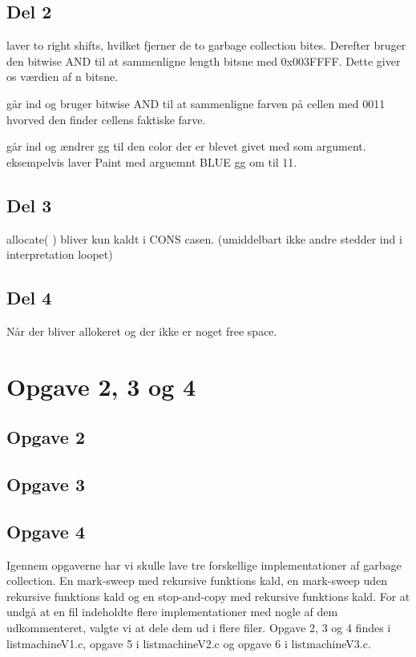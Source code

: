\subsection{Del 2}
\label{O1_2}
\begin{my_itemize}
	\item[Length] laver to right shifts, hvilket fjerner de to garbage collection bites. Derefter bruger den bitwise AND til at sammenligne length bitsne med 0x003FFFF. Dette giver os værdien af n bitsne.
	\item[Color] går ind og bruger bitwise AND til at sammenligne farven på cellen med 0011 hvorved den finder cellens faktiske farve.
	\item[Paint] går ind og ændrer gg til den color der er blevet givet med som argument. eksempelvis laver Paint med arguemnt BLUE gg om til 11.
\end{my_itemize}

\subsection{Del 3}
\label{O1_3}
allocate( ) bliver kun kaldt i CONS casen.  (umiddelbart ikke andre stedder ind i interpretation loopet)

\subsection{Del 4}
\label{O1_4}
Når der bliver allokeret og der ikke er noget free space.

\section{Opgave 2, 3 og 4}
\label{O2}

\subsection{Opgave 2}
\label{O2_2}

\subsection{Opgave 3}
\label{O2_3}

\subsection{Opgave 4}
\label{O2_4}

Igennem opgaverne har vi skulle lave tre forskellige implementationer af garbage collection. En mark-sweep med rekursive funktions kald, en mark-sweep uden rekursive funktions kald og en stop-and-copy med rekursive funktions kald. For at undgå at en fil indeholdte flere implementationer med nogle af dem udkommenteret, valgte vi at dele dem ud i flere filer. Opgave 2, 3 og 4 findes i listmachineV1.c, opgave 5 i listmachineV2.c og opgave 6 i listmachineV3.c.

